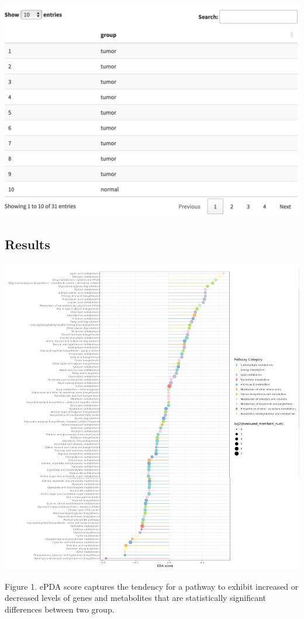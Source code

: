 \documentclass[
]{book}
\begin{document}
\begin{flushleft}\includegraphics[width=21.83in]{figure/GroupInfo} \end{flushleft}

\subsection{Results}\label{results-2}

\begin{center}\includegraphics[width=0.7\linewidth]{figure/2.ePDA} \end{center}

Figure 1. ePDA score captures the tendency for a pathway to exhibit increased or decreased levels of genes and metabolites that are statistically significant differences between two group.
\end{document}
